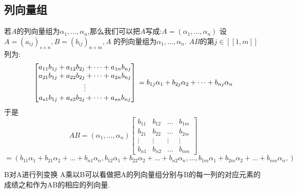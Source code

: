 \documentclass{book}
\begin{document}
\subsection{列向量组}
若$A$的列向量组为$\alpha_1,\ldots,\alpha_n$,那么我们可以把$A$写成:$A=(\alpha_1,\ldots,\alpha_n)$ \newline
设$A=(a_{ij})_{s\times n},B=(b_{ij})_{n\times m},A$ 的列向量组为$\alpha_1,\ldots,\alpha_n$. \newline
$AB$的第$j\in [[1,m]]$列为: \newline
$$
\begin{bmatrix}
  a_{11}b_{1j}+a_{12}b_{2j}+\dots+a_{1n}b_{nj}  \\
  a_{21}b_{1j}+a_{22}b_{2j}+\dots+a_{2n}b_{nj}  \\
  \vdots \\
  a_{s1}b_{1j}+a_{s2}b_{2j}+\dots+a_{sn}b_{nj}
\end{bmatrix}
\\
=
b_{1j}\alpha_1+b_{2j}\alpha_2+\dots+b_{nj}\alpha_n
$$
于是
$$
AB=(\alpha_1,\ldots,\alpha_n)
\begin{bmatrix}
  b_{11} & b_{12} & \dots & b_{1m}  \\
  b_{21} & b_{22} & \dots & b_{2m}  \\
  \vdots & \vdots & \vdots &\vdots \\
  b_{n1} & b_{n2} & \dots & b_{nm}
\end{bmatrix}
$$
$=(b_{11}\alpha_1+b_{21}\alpha_2+\dots+b_{n1}\alpha_n,b_{12}\alpha_1+b_{22}\alpha_2+\dots+b_{n2}\alpha_n,\ldots,b_{1m}\alpha_1+b_{2m}\alpha_2+\dots+b_{nm}\alpha_n,)$
\begin{note}
B对A进行列变换 \newline
A乘以B可以看做把A的列向量组分别与B的每一列的对应元素的成绩之和作为AB的相应的列向量.
\end{note}
\end{document}
